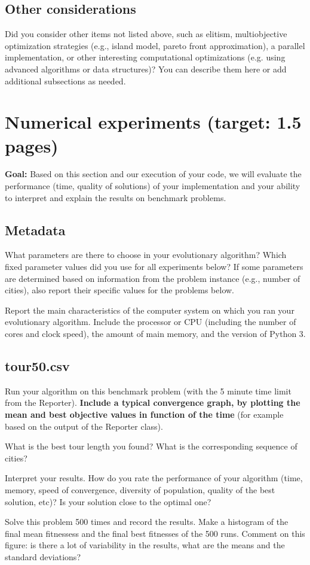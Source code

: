 \documentclass[a4paper,10pt]{article}
\newcommand{\ReplaceMe}[1]{{\color{blue}#1}}
\newcommand{\RemoveMe}[1]{{\color{purple}#1}}
\begin{document}
\subsection{Other considerations}\label{sec_oth}

\ReplaceMe{Did you consider other items not listed above, such as elitism, multiobjective optimization strategies (e.g., island model, pareto front approximation), a parallel implementation, or other interesting computational optimizations (e.g. using advanced algorithms or data structures)? You can describe them here or add additional subsections as needed.}


\section{Numerical experiments (target: 1.5 pages)}

\RemoveMe{\textbf{Goal:} Based on this section and our execution of your code, we will evaluate the performance (time, quality of solutions) of your implementation and your ability to interpret and explain the results on benchmark problems.}

\subsection{Metadata}

\ReplaceMe{What parameters are there to choose in your evolutionary algorithm? Which fixed parameter values did you use for all experiments below? If some parameters are determined based on information from the problem instance (e.g., number of cities), also report their specific values for the problems below.

Report the main characteristics of the computer system on which you ran your evolutionary algorithm. Include the processor or CPU (including the number of cores and clock speed), the amount of main memory, and the version of Python 3.}


\subsection{tour50.csv}

\ReplaceMe{Run your algorithm on this benchmark problem (with the 5 minute time limit from the Reporter). \textbf{Include a typical convergence graph, by plotting the mean and best objective values in function of the time} (for example based on the output of the Reporter class).

What is the best tour length you found? What is the corresponding sequence of cities? 

Interpret your results. How do you rate the performance of your algorithm (time, memory, speed of convergence, diversity of population, quality of the best solution, etc)? Is your solution close to the optimal one?

Solve this problem 500 times and record the results. Make a histogram of the final mean fitnessess and the final best fitnesses of the 500 runs. Comment on this figure: is there a lot of variability in the results, what are the means and the standard deviations?}
\end{document}
